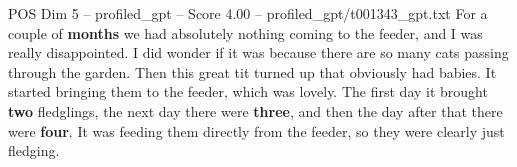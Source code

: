 \begin{textsample}{POS Dim 5 – profiled\_gpt – Score 4.00 – profiled\_gpt/t001343\_gpt.txt}  \label{ex:f5_pos_025}
For a couple of \textbf{months} we had absolutely nothing coming to the feeder, and I was really disappointed.
I did wonder if it was because there are so many cats passing through the garden.
Then this great tit turned up that obviously had babies.
It started bringing them to the feeder, which was lovely.
The first day it brought \textbf{two} fledglings, the next day there were \textbf{three}, and then the day after that there were \textbf{four}.
It was feeding them directly from the feeder, so they were clearly just fledging.

\end{textsample}
